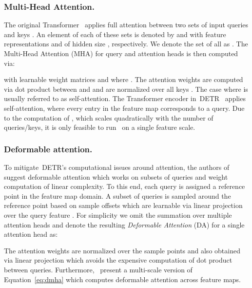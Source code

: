 \documentclass[runningheads]{llncs}
\newcommand{\detr}{\mbox{DETR}}
\begin{document}
\subsubsection{Multi-Head Attention.} The original Transformer~\cite{attention_is_all_you_need} applies full attention between two sets of input queries  and keys .
An element of each of these sets is denoted by  and  with feature representations  and  of hidden size , respectively.
We denote the set of all  as .
The Multi-Head Attention (MHA) for query  and  attention heads is then computed via:



with learnable weight matrices  and  where .
The attention weights  are computed via dot product between  and  and are normalized over all keys .
The case where  is usually referred to as self-attention.
The Transformer encoder in~\detr{}~\cite{DETR} applies self-attention, where every entry in the feature map corresponds to a query.
Due to the computation of , which scales quadratically with the number of queries/keys, it is only feasible to run~\cite{DETR} on a single feature scale.


\subsubsection{Deformable attention.}
To mitigate~\detr{}'s computational issues around attention, the authors of~\cite{deformable_detr} suggest deformable attention which works on subsets of queries and weight computation of linear complexity.
To this end, each query  is assigned a reference point  in the feature map domain.
A subset of  queries is sampled around the reference point based on sample offsets  which are learnable via linear projection over the query feature .
For simplicity we omit the summation over multiple attention heads and denote the resulting \textit{Deformable Attention} (DA) for a single attention head  as:



The attention weights are normalized over the sample points  and also obtained via linear projection which avoids the expensive computation of dot product between queries.
Furthermore,~\cite{deformable_detr} present a multi-scale version of Equation~\ref{eq:dmha} which computes deformable attention across feature maps.
\end{document}
